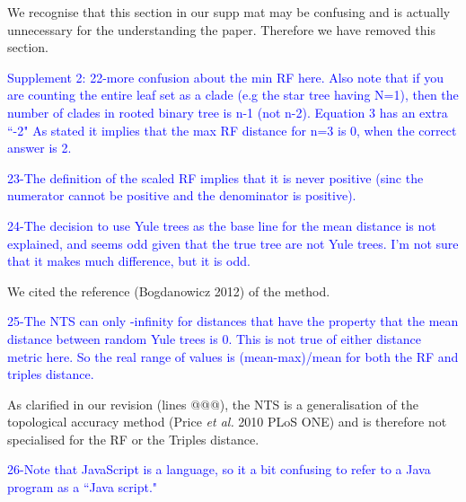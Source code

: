 \documentclass[11pt]{letter}
\begin{document}
\begin{letter}{}



We recognise that this section in our supp mat may be confusing and is actually unnecessary for the understanding the paper. Therefore we have removed this section. %

\textcolor{blue}{Supplement 2:}
\textcolor{blue}{22-more confusion about the min RF here. Also note that if you are counting the entire leaf set as a clade (e.g the star tree having N=1), then the number of clades in rooted binary tree is n-1 (not n-2). Equation 3 has an extra ``-2" As stated it implies that the max RF distance for n=3 is 0, when the correct answer is 2.}



\textcolor{blue}{23-The definition of the scaled RF implies that it is never positive (sinc the numerator cannot be positive and the denominator is positive).}



\textcolor{blue}{24-The decision to use Yule trees as the base line for the mean distance is not explained, and seems odd given that the true tree are not Yule trees. I'm not sure that it makes much difference, but it is odd.}

We cited the reference (Bogdanowicz 2012) of the method.


\textcolor{blue}{25-The NTS can only -infinity for distances that have the property that the mean distance between random Yule trees is 0. This is not true of either distance metric here. So the real range of values is (mean-max)/mean for both the RF and triples distance.}

As clarified in our revision (lines @@@), the NTS is a generalisation of the topological accuracy method (Price \textit{et al.} 2010 PLoS ONE) and is therefore not specialised for the RF or the Triples distance.


\textcolor{blue}{26-Note that JavaScript is a language, so it a bit confusing to refer to a Java program as a ``Java script."}


\end{letter}
\end{document}
